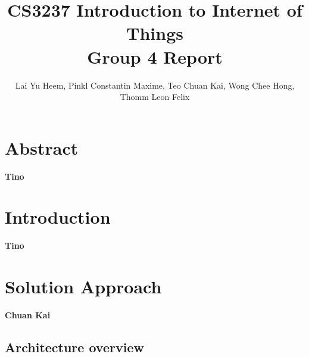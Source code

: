 \documentclass{article}
\begin{document}

\title{CS3237 Introduction to Internet of Things \\ Group 4 Report}
\author{Lai Yu Heem, Pinkl Constantin Maxime, Teo Chuan Kai, Wong Chee Hong, Thomm Leon Felix}
\maketitle

\renewcommand\thesection{\arabic{section}}
\renewcommand\thesubsection{\thesection.\alph{subsection}}

\section{Abstract}

\textbf{Tino}

\section{Introduction}

\textbf{Tino}

\section{Solution Approach}

\textbf{Chuan Kai}

\subsection{Architecture overview}
\end{document}
